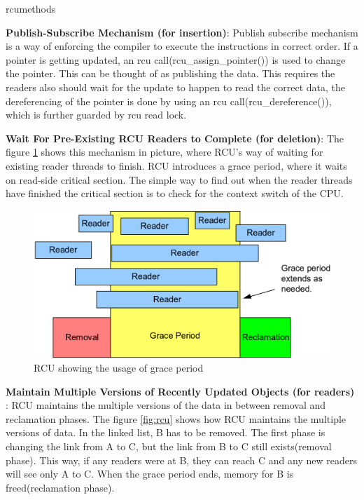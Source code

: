 \begin{labeling}{rcumethods}
\item[\textbf{Publish-Subscribe Mechanism (for insertion)}:]
Publish subscribe mechanism is a way of enforcing the compiler to execute the instructions in correct order. If a pointer is getting updated, an rcu call(rcu\_assign\_pointer())  is used to change the pointer. This can be thought of as publishing the data. This requires the readers also should wait for the update to happen to read the correct data, the dereferencing of the pointer is done by using an rcu call(rcu\_dereference()), which is further guarded by rcu read lock.

\item[\textbf{Wait For Pre-Existing RCU Readers to Complete (for deletion)}:]
The figure \ref{fig:rcu_grace} shows this mechanism in picture, where RCU's way of waiting for existing reader threads to finish. RCU introduces a grace period, where it waits on read-side critical section. The simple way to find out when the reader threads have finished the critical section is to check for the context switch of the CPU. 

\begin{figure}[h]
\centering
\includegraphics[width=0.7\linewidth]{figures/rcu_grace}
\caption{RCU showing the usage of grace period \cite{whatisrcu}}
\label{fig:rcu_grace}
\end{figure}

\item[\textbf{Maintain Multiple Versions of Recently Updated Objects (for readers)}]:
RCU maintains the multiple versions of the data in between removal and reclamation phases. The figure \ref{fig:rcu} shows how RCU maintains the multiple versions of data. In the linked list, B has to be removed. The first phase is changing the link from A to C, but the link from B to C still exists(removal phase). This way, if any readers were at B, they can reach C and any new readers will see only A to C. When the grace period ends, memory for B is freed(reclamation phase).


\end{labeling}
